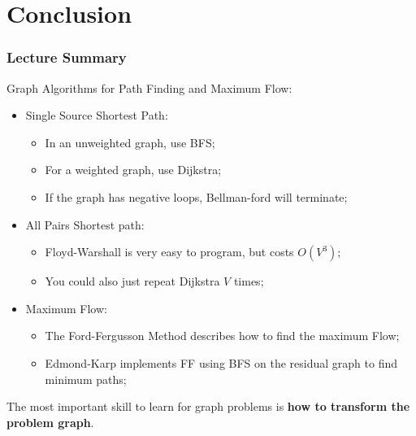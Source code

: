 \section{Conclusion}

\begin{frame}
  \frametitle{Lecture Summary}

  Graph Algorithms for Path Finding and Maximum Flow:\bigskip

  \begin{itemize}
    \item Single Source Shortest Path:
    \begin{itemize}
      \item In an unweighted graph, use BFS;
      \item For a weighted graph, use Dijkstra;
      \item If the graph has negative loops, Bellman-ford will terminate;
    \end{itemize}\medskip
    \item All Pairs Shortest path:
    \begin{itemize}
      \item Floyd-Warshall is very easy to program, but costs $O(V^3)$;
      \item You could also just repeat Dijkstra $V$ times;
    \end{itemize}\medskip
    \item Maximum Flow:
    \begin{itemize}
      \item The Ford-Fergusson Method describes how to find the maximum Flow;
      \item Edmond-Karp implements FF using BFS on the residual graph to find minimum paths;
    \end{itemize}
  \end{itemize}\bigskip

  The most important skill to learn for graph problems is {\bf how to transform the problem graph}.
\end{frame}


